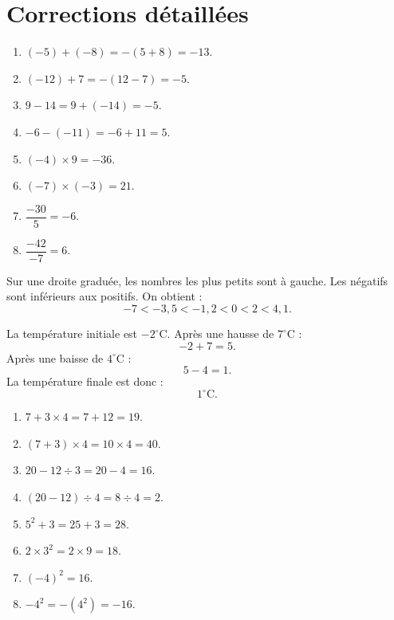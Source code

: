 \documentclass[11pt,a4paper]{article}
\newcounter{correction}
\newcommand{\encadre}[1]{\boxed{\displaystyle #1}}
\begin{document}
\newpage

\section{Corrections détaillées}

\begin{correction}
\begin{enumerate}[label=\alph*)]
  \item $(-5)+(-8)=-(5+8)=-13$.
  \item $(-12)+7=-(12-7)=-5$.
  \item $9-14=9+(-14)=-5$.
  \item $-6-(-11)=-6+11=5$.
  \item $(-4)\times9=-36$.
  \item $(-7)\times(-3)=21$.
  \item $\dfrac{-30}{5}=-6$.
  \item $\dfrac{-42}{-7}=6$.
\end{enumerate}
\end{correction}

\begin{correction}[Rangement]
Sur une droite graduée, les nombres les plus petits sont à gauche. Les négatifs sont inférieurs aux positifs. On obtient :
\[
\encadre{-7<-3{,}5<-1{,}2<0<2<4{,}1}.
\]
\end{correction}

\begin{correction}[Température]
La température initiale est $-2^\circ$C. Après une hausse de $7^\circ$C :
\[
-2+7=5.
\]
Après une baisse de $4^\circ$C :
\[
5-4=1.
\]
La température finale est donc :
\[
\encadre{1^\circ\text{C}}.
\]
\end{correction}

\begin{correction}
\begin{enumerate}[label=\alph*)]
  \item $7+3\times4=7+12=19$.
  \item $(7+3)\times4=10\times4=40$.
  \item $20-12\div3=20-4=16$.
  \item $(20-12)\div4=8\div4=2$.
  \item $5^2+3=25+3=28$.
  \item $2\times3^2=2\times9=18$.
  \item $(-4)^2=16$.
  \item $-4^2=-(4^2)=-16$.
\end{enumerate}
\end{correction}
\end{document}
